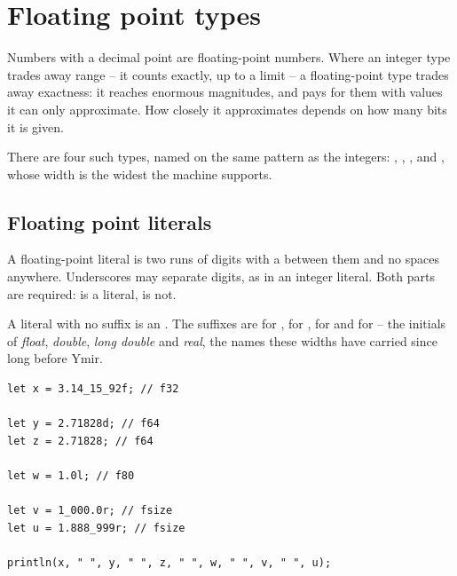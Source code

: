 \vfill%
\pagebreak
\section{Floating point types}
\label{sec:types:floats}

Numbers with a decimal point are floating-point numbers. Where an integer type
trades away range -- it counts exactly, up to a limit -- a floating-point type
trades away exactness: it reaches enormous magnitudes, and pays for them with
values it can only approximate. How closely it approximates depends on how many
bits it is given.

There are four such types, named on the same pattern as the integers:
, , , and , whose width is the
widest the machine supports.

\subsection{Floating point literals}

A floating-point literal is two runs of digits with a  between them and
no spaces anywhere. Underscores may separate digits, as in an integer literal.
Both parts are required:  is a literal,  is not.

A literal with no suffix is an . The suffixes are  for
,  for ,  for  and 
for  -- the initials of \textit{float}, \textit{double},
\textit{long double} and \textit{real}, the names these widths have carried
since long before Ymir.

\begin{lstlisting}[style=coloredverbatim, label=lst:types:float_literal, caption=Example of floating point literals]
let x = 3.14_15_92f; // f32

let y = 2.71828d; // f64
let z = 2.71828; // f64

let w = 1.0l; // f80

let v = 1_000.0r; // fsize
let u = 1.888_999r; // fsize

println(x, " ", y, " ", z, " ", w, " ", v, " ", u);
\end{lstlisting}


